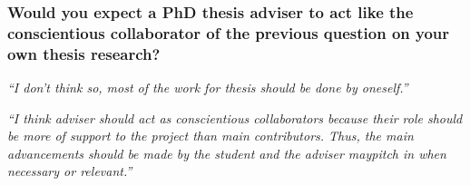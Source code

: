 \documentclass[12pt]{beamer}
\newcommand\ans[1]{{\it ``#1''}}
\newcommand\gap{\vspace{5mm}}
\begin{document}




\begin{frame} %
\frametitle{Would you expect a PhD thesis adviser to act like the conscientious collaborator of the previous question on your own thesis research?}





\ans{I don’t think so, most of the work for thesis should be done by oneself.}

\gap

\ans{I think adviser should act as conscientious collaborators because their role should be more of support to the project than main contributors. Thus,  the  main  advancements  should  be  made  by  the  student  and  the  adviser  maypitch in when necessary or relevant.}

\end{frame}
\end{document}
